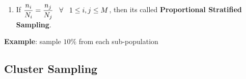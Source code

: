 \begin{enumerate}[itemsep=0.3cm]
    \item If $
        \dfrac{n_i}{N_i} = \dfrac{n_j}{N_j} 
        \hspace{0.3cm} 
        \forall 
        \hspace{0.3cm} 
        1\leq i,j \leq M 
    $, then its called \textbf{Proportional Stratified Sampling}.\label{Sampling Plans/Representative Sampling/Stratified Sampling/Proportional Stratified Sampling}
    \hfill \cite{statistics/book/Statistics-for-Data-Scientists/Maurits-Kaptein}

\end{enumerate}


\vspace{0.5cm}
\textbf{Example}: sample $10\%$ from each sub-population







\subsection{Cluster Sampling \cite{statistics/book/Statistics-for-Data-Scientists/Maurits-Kaptein}}\label{Sampling Plans/Representative Sampling/Cluster Sampling}

